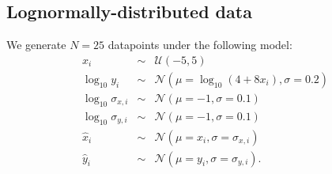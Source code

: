 \documentclass[fleqn,usenatbib]{mnras}
\begin{document}
\subsection{Lognormally-distributed data}
\label{sec:data-models.lognormal}

We generate $N = 25$ datapoints under the following model:
\begin{eqnarray}
    x_i &\sim& \mathcal U (-5, 5) \\
    \log_{10} y_i &\sim& \mathcal N (\mu = \log_{10} (4 + 8 x_i), \sigma = 0.2) \\
    \log_{10} \sigma_{x, i} &\sim& \mathcal N (\mu = -1, \sigma = 0.1) \\
    \log_{10} \sigma_{y, i} &\sim& \mathcal N (\mu = -1, \sigma = 0.1) \\
    \hat{x}_i &\sim& \mathcal N (\mu = x_i, \sigma = \sigma_{x, i}) \\
    \hat{y}_i &\sim& \mathcal N (\mu = y_i, \sigma = \sigma_{y, i}).
\end{eqnarray}




\bsp	%
\label{lastpage}
\end{document}
